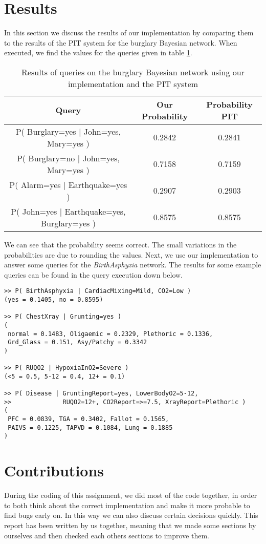 \documentclass[10pt,a4paper]{article}
\begin{document}
\section{Results}
In this section we discuss the results of our implementation by comparing them to the results of the PIT system for the burglary Bayesian network. When executed, we find the values for the queries given in table \ref{tableburglary}.
\begin{table}[H]
\begin{tabular}{|c|c|c|}
\hline 
\textbf{Query} & \textbf{Our Probability} & \textbf{Probability PIT} \\ 
\hline 
P( Burglary=yes $|$ John=yes, Mary=yes ) & 0.2842 & 0.2841 \\ 
\hline 
P( Burglary=no $|$ John=yes, Mary=yes ) & 0.7158 & 0.7159 \\ 
\hline 
P( Alarm=yes $|$ Earthquake=yes ) & 0.2907 & 0.2903 \\ 
\hline 
P( John=yes $|$ Earthquake=yes, Burglary=yes ) & 0.8575 & 0.8575 \\ 
\hline 
\end{tabular} 
\caption{Results of queries on the burglary Bayesian network using our implementation and the PIT system}
\label{tableburglary}
\end{table}
We can see that the probability seems correct. The small variations in the probabilities are due to rounding the values. Next, we use our implementation to answer some queries for the \emph{BirthAsphyxia} network. The results for some example queries can be found in the query execution down below.
\begin{verbatim}
>> P( BirthAsphyxia | CardiacMixing=Mild, CO2=Low )
(yes = 0.1405, no = 0.8595)

>> P( ChestXray | Grunting=yes )
(
 normal = 0.1483, Oligaemic = 0.2329, Plethoric = 0.1336, 
 Grd_Glass = 0.151, Asy/Patchy = 0.3342
)

>> P( RUQO2 | HypoxiaInO2=Severe )
(<5 = 0.5, 5-12 = 0.4, 12+ = 0.1)

>> P( Disease | GruntingReport=yes, LowerBodyO2=5-12,
>>              RUQO2=12+, CO2Report=>=7.5, XrayReport=Plethoric )
(
 PFC = 0.0839, TGA = 0.3402, Fallot = 0.1565,
 PAIVS = 0.1225, TAPVD = 0.1084, Lung = 0.1885
)
\end{verbatim}
\section{Contributions}
During the coding of this assignment, we did most of the code together, in order to both think about the correct implementation and make it more probable to find bugs early on. In this way we can also discuss certain decisions quickly. This report has been written by us together, meaning that we made some sections by ourselves and then checked each others sections to improve them.
\end{document}
